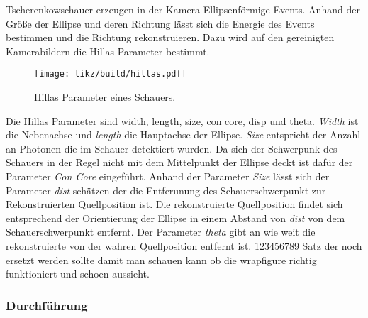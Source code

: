 Tscherenkowschauer erzeugen in der Kamera Ellipsenförmige Events.
Anhand der Größe der Ellipse und deren Richtung lässt sich die Energie des
Events bestimmen und die Richtung rekonstruieren.
Dazu wird auf den gereinigten Kamerabildern die Hillas Parameter bestimmt.


\begin{wrapfigure}[15]{o}{0.4\textwidth}
	\centering
	\texttt{[image: tikz/build/hillas.pdf]}
	\caption{Hillas Parameter eines Schauers.}%
	\label{fig:hillas}
\end{wrapfigure}


Die Hillas Parameter sind width, length, size, con core, disp und theta.
\textit{Width} ist die Nebenachse und \textit{length} die Hauptachse der Ellipse. 
\textit{Size} entspricht der Anzahl an Photonen die im Schauer detektiert wurden.
Da sich der Schwerpunk des Schauers in der Regel nicht mit dem Mittelpunkt der
Ellipse deckt ist dafür der Parameter \textit{Con Core} eingeführt.
Anhand der Parameter \textit{Size} lässt sich der Parameter \textit{dist}
schätzen der die Entferunung des Schauerschwerpunkt zur Rekonstruierten
Quellposition ist.
Die rekonstruierte Quellposition findet sich entsprechend der Orientierung der
Ellipse in einem Abstand von \textit{dist} von dem Schauerschwerpunkt entfernt.
Der Parameter \textit{theta} gibt an wie weit die rekonstruierte von der wahren
Quellposition entfernt ist.
123456789 Satz der noch ersetzt werden sollte damit man schauen kann ob die wrapfigure
richtig funktioniert und schoen aussieht.

\subsubsection*{Durchführung}
